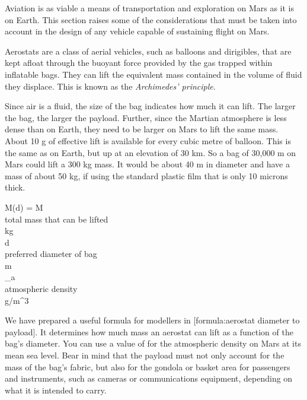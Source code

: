 

Aviation is as viable a means of transportation and exploration on Mars as it is on Earth. This section raises some of the considerations that must be taken into account in the design of any vehicle capable of sustaining flight on Mars.

Aerostats are a class of aerial vehicles, such as balloons and dirigibles, that are kept afloat through the buoyant force provided by the gas trapped within inflatable bags. They can lift the equivalent mass contained in the volume of fluid they displace. This is known as the {\it Archimedes' principle}. 

Since air is a fluid, the size of the bag indicates how much it can lift. The larger the bag, the larger the payload. Further, since the Martian atmosphere is less dense than on Earth, they need to be larger on Mars to lift the same mass. About 10 g of effective lift is available for every cubic metre of balloon. This is the same as on Earth, but up at an elevation of 30 km. So a bag of 30,000 m on Mars could lift a 300 kg mass. It would be about 40 m in diameter and have a mass of about 50 kg, if using the standard plastic film that is only 10 microns thick.

\crlf
{}
\startformula
M(d) = 
\stopformula
\startlegend
\leg M \\ total mass that can be lifted \\ kg \\
\leg d \\ preferred diameter of bag \\ m \\
\leg {\rho}_a \\ atmospheric density \\ g/m^{3} \\
\stoplegend
\crlf

We have prepared a useful formula for modellers in [formula:aerostat diameter to payload]. It determines how much mass an aerostat can lift as a function of the bag's diameter. You can use a value of  for the atmospheric density on Mars at its mean sea level. Bear in mind that the payload must not only account for the mass of the bag's fabric, but also for the gondola or basket area for passengers and instruments, such as cameras or communications equipment, depending on what it is intended to carry.

